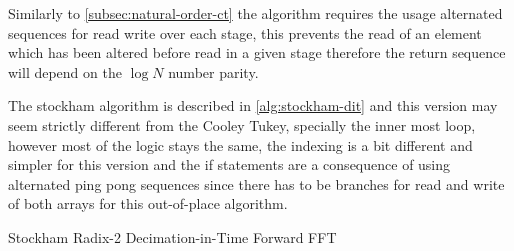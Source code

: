 \documentclass[
  oneside,
  11pt, a4paper,
  footinclude=true,
  headinclude=true,
  cleardoublepage=empty
]{scrbook}
\begin{document}
Similarly to \autoref{subsec:natural-order-ct} the algorithm requires the usage alternated sequences for read write over each stage, this prevents the read of an element which has been altered before read in a given stage therefore the return sequence will depend on the $\log{N}$ number parity.

The stockham algorithm is described in \autoref{alg:stockham-dit} and this version may seem strictly different from the Cooley Tukey, specially the inner most loop, however most of the logic stays the same, the indexing is a bit different and simpler for this version and the if statements are a consequence of using alternated ping pong sequences since there has to be branches for read and write of both arrays for this out-of-place algorithm.



\begin{algorithm}[H]
    \caption{Stockham Radix-2 Decimation-in-Time Forward FFT} \label{alg:stockham-dit}

\end{algorithm}
\end{document}

